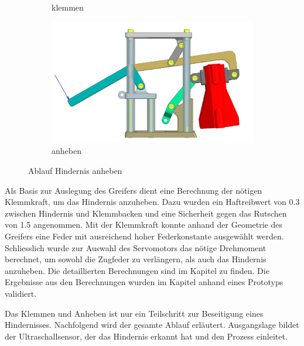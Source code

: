 \begin{figure}[H]
\begin{subfigure}{0.49\textwidth}
\caption{klemmen}
\label{fig:gripper_gripping_side}
\end{subfigure}
\begin{subfigure}{0.49\textwidth}
\centering
\includegraphics[width=\textwidth]{assets/greifer-prototyp/Greifer_side_Angehoben.png}
\caption{anheben}
\label{fig:gripper_lifting_side}
\end{subfigure}
\caption{Ablauf Hindernis anheben}
\label{fig:obstacle_gripping_process}
\end{figure}

 \newpage
 
Als Basis zur Auslegung des Greifers dient eine Berechnung der nötigen Klemmkraft, um das Hindernis anzuheben. Dazu wurden ein Haftreibwert von 0.3 zwischen Hindernis und Klemmbacken und eine Sicherheit gegen das Rutschen von 1.5 angenommen. Mit der Klemmkraft konnte anhand der Geometrie des Greifers eine Feder mit ausreichend hoher Federkonstante ausgewählt werden. Schliesslich wurde zur Auswahl des Servomotors das nötige Drehmoment berechnet, um sowohl die Zugfeder zu verlängern, als auch das Hindernis anzuheben. Die detaillierten Berechnungen sind im Kapitel  zu finden. Die Ergebnisse aus den Berechnungen wurden im Kapitel  anhand eines Prototyps validiert.

Das Klemmen und Anheben ist nur ein Teilschritt  zur Beseitigung eines Hindernisses. Nachfolgend wird der gesamte Ablauf erläutert. Ausgangslage bildet der Ultraschallsensor, der das Hindernis erkannt hat und den Prozess einleitet. 


